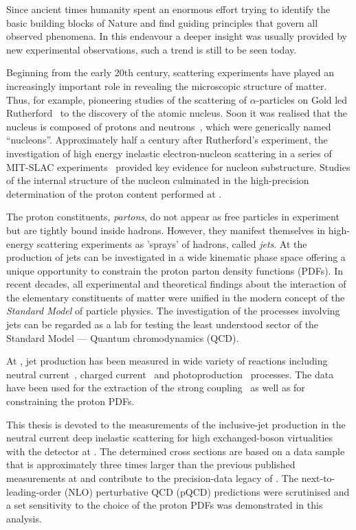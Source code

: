 Since ancient times humanity spent an enormous effort trying to identify the basic building blocks of Nature and find guiding principles that govern all observed phenomena. In this endeavour a deeper insight was usually provided by new experimental observations, such a trend is still to be seen today.

Beginning from the early 20th century, scattering experiments have played an increasingly important role in revealing the microscopic structure of matter. Thus, for example, pioneering studies of the scattering of $\alpha$-particles on Gold led Rutherford~\cite{rutherford} to the discovery of the atomic nucleus. Soon it was realised that the nucleus is composed of protons and neutrons~\cite{Chadwick}, which were generically named ``nucleons''. Approximately half a century after Rutherford's experiment, the investigation of high energy inelastic electron-nucleon scattering in a series of MIT-SLAC experiments~\cite{slac} provided key evidence for nucleon substructure. Studies of the internal structure of the nucleon culminated in the high-precision determination of the proton content performed at \hera.

The proton constituents, \emph{partons}, do not appear as free particles in experiment but are tightly bound inside hadrons. However, they manifest themselves in high-energy scattering experiments as 'sprays' of hadrons, called \emph{jets}. At \hera the production of jets can be investigated in a wide kinematic phase space offering a unique opportunity to constrain the proton parton density functions (PDFs). In recent decades, all experimental and theoretical findings about the interaction of the elementary constituents of matter were unified in the modern concept of the \emph{Standard Model} of particle physics. The investigation of the processes involving jets can be regarded as a lab for testing the least understood sector of the Standard Model --- Quantum chromodynamics (QCD).

At \hera, jet production has been measured in wide variety of reactions including neutral current~\cite{ncjets}, charged current~\cite{ccjets} and photoproduction~\cite{phpjets} processes. The data have been used for the extraction of the strong coupling~\cite{jets} as well as for constraining the proton PDFs.

This thesis is devoted to the measurements of the inclusive-jet production in the neutral current deep inelastic scattering for high exchanged-boson virtualities with the \zeus detector at \hera. The determined cross sections are based on a data sample that is approximately three times larger than the previous published measurements at \zeus and contribute to the precision-data legacy of \hera. The next-to-leading-order (NLO) perturbative QCD (pQCD) predictions were scrutinised and a set sensitivity to the choice of the proton PDFs was demonstrated in this analysis.

